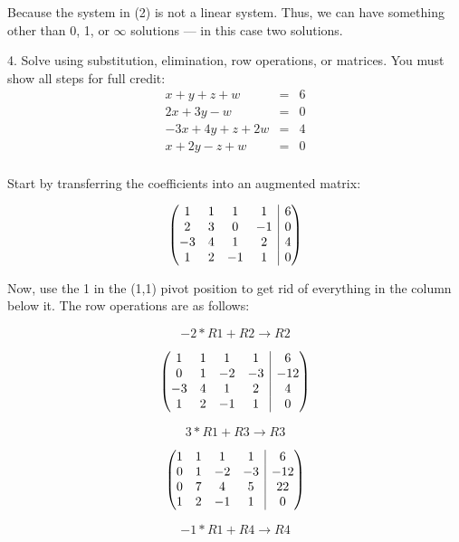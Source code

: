 \documentclass[letterpaper, 12pt]{article}
\begin{document}
Because the system in (2) is not a linear system. Thus, we can have something
other than 0, 1, or $\infty$ solutions --- in this case two solutions.

\bigskip

4. Solve using substitution, elimination, row operations, or matrices. You must
show all steps for full credit:
\begin{eqnarray*}
x+y+z+w &=& 6 \\
2x+3y-w &=& 0 \\
-3x+4y+z+2w &=& 4 \\
x+2y-z+w &=& 0 \\
\end{eqnarray*}

Start by transferring the coefficients into an augmented matrix:

\newenvironment{amatrix}[1]{%
  \left(\begin{array}{@{}*{#1}{c}|c@{}}
}{%
  \end{array}\right)
}

\[\begin{amatrix}{4}
1 & 1 & 1 & 1 & 6 \\
2 & 3 & 0 & -1 & 0 \\
-3 & 4 & 1 & 2 & 4 \\
1 & 2 & -1 & 1 & 0 \\
\end{amatrix}\]

Now, use the 1 in the (1,1) pivot position to get rid of everything in the
column below it. The row operations are as follows:

\[-2*R1+R2\to R2\]

\[\begin{amatrix}{4}
1 & 1 & 1 & 1 & 6 \\
0 & 1 & -2 & -3 & -12 \\
-3 & 4 & 1 & 2 & 4 \\
1 & 2 & -1 & 1 & 0 \\
\end{amatrix}\]

\[3*R1+R3\to R3\]

\[\begin{amatrix}{4}
1 & 1 & 1 & 1 & 6 \\
0 & 1 & -2 & -3 & -12 \\
0 & 7 & 4 & 5 & 22 \\
1 & 2 & -1 & 1 & 0 \\
\end{amatrix}\]

\[-1*R1+R4\to R4\]
\end{document}
